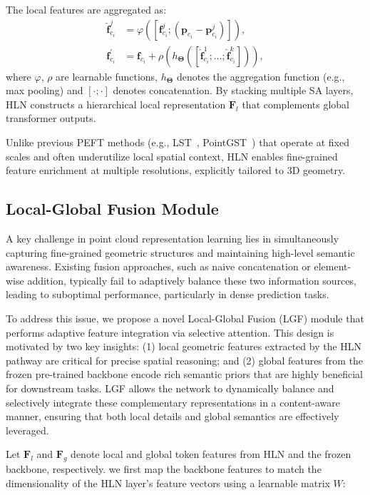 The local features are aggregated as:
\begin{align}
    \hat{\mathbf{f}}_{c_i}^{j} &= \varphi\left(\left[\mathbf{f}_{c_i}^{j}; (\mathbf{p}_{c_i} - \mathbf{p}_{c_i}^j)\right]\right), \\
    \mathbf{f}_{c_i}^{\prime} &= \mathbf{f}_{c_i} + \rho\left(h_{\boldsymbol{\Theta}}([\hat{\mathbf{f}}_{c_i}^{1}; \dots; \hat{\mathbf{f}}_{c_i}^{k}])\right),
\end{align}
where $\varphi$, $\rho$ are learnable functions, $h_{\boldsymbol{\Theta}}$ denotes the aggregation function (e.g., max pooling) and $[\cdot ; \cdot]$ denotes concatenation. By stacking multiple SA layers, HLN constructs a hierarchical local representation $\mathbf{F}_l$ that complements global transformer outputs.

Unlike previous PEFT methods (e.g., LST~\cite{sung2022lst}, PointGST~\cite{liang2024parameter}) that operate at fixed scales and often underutilize local spatial context, HLN enables fine-grained feature enrichment at multiple resolutions, explicitly tailored to 3D geometry.

\subsection{Local-Global Fusion Module}
\label{sec:LGF}
A key challenge in point cloud representation learning lies in simultaneously capturing fine-grained geometric structures and maintaining high-level semantic awareness. Existing fusion approaches, such as naive concatenation or element-wise addition, typically fail to adaptively balance these two information sources, leading to suboptimal performance, particularly in dense prediction tasks.

To address this issue, we propose a novel Local-Global Fusion (LGF) module that performs adaptive feature integration via selective attention. This design is motivated by two key insights: (1) local geometric features extracted by the HLN pathway are critical for precise spatial reasoning; and (2) global features from the frozen pre-trained backbone encode rich semantic priors that are highly beneficial for downstream tasks. LGF allows the network to dynamically balance and selectively integrate these complementary representations in a content-aware manner, ensuring that both local details and global semantics are effectively leveraged.

Let $\mathbf{F}_l$ and $\mathbf{F}_g$ denote local and global token features from HLN and the frozen backbone, respectively. we first map the backbone features to match the dimensionality of the HLN layer’s feature vectors using a learnable matrix $W$:

